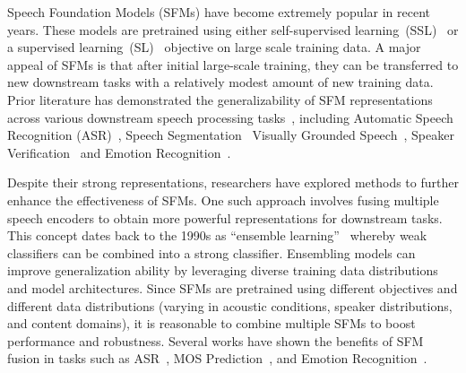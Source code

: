 Speech Foundation Models (SFMs) have become extremely popular in recent years.
These models are pretrained using either self-supervised learning~(SSL)~\cite{hsu2021hubert,Baevski_wav2vec2,Chen2021WavLMLS,baevski22_data2vec} or a supervised learning~(SL)~\cite{radford23_whisper} objective on large scale training data.
A major appeal of SFMs is that after initial large-scale training, they can be transferred to new downstream tasks with a relatively modest amount of new training data.
Prior literature has demonstrated the generalizability of SFM representations across various downstream speech processing tasks~\cite{yang_SfmEval,shi23g_mlsuperb}, including Automatic Speech Recognition (ASR)~\cite{baevski2021wav2vec-u,liu2022wav2vec-u2}, Speech Segmentation~\cite{peng2022vghubert,Strgar_2022}
Visually Grounded Speech~\cite{shihSpeechCLIP,layne_mspchclip}, Speaker Verification~\cite{aldeneh24_SVDS} and Emotion Recognition~\cite{Morais_emotion_ssl}.



Despite their strong representations, researchers have explored methods to further enhance the effectiveness of SFMs.
One such approach involves fusing multiple speech encoders to obtain more powerful representations for downstream tasks. 
This concept dates back to the 1990s as ``ensemble learning''~\cite{Hansen90_ensemble,schapire90_strength,Breiman96_BaggingP,Freund_adaboost} whereby weak classifiers can be combined into a strong classifier.
Ensembling models can improve generalization ability by leveraging diverse training data distributions and model architectures.
Since SFMs are pretrained using different objectives and different data distributions (varying in acoustic conditions, speaker distributions, and content domains), it is reasonable to combine multiple SFMs to boost performance and robustness.
Several works have shown the benefits of SFM fusion in tasks such as ASR~\cite{tang22_fusion,fu23b_otf}, MOS Prediction~\cite{yang22o_mosFusion}, and Emotion Recognition~\cite{morais22_erFusion}.

